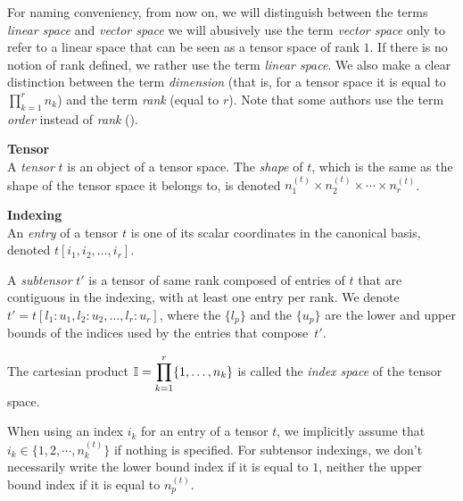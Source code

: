 \begin{remark}
For naming conveniency, from now on, we will distinguish between the terms \emph{linear space} and \emph{vector space} \ie we will abusively use the term \emph{vector space} only to refer to a linear space that can be seen as a tensor space of rank $1$. If there is no notion of rank defined, we rather use the term \emph{linear space}.
We also make a clear distinction between the term \emph{dimension} (that is, for a tensor space it is equal to $\displaystyle \prod_{k=1}^r n_k$) and the term \emph{rank} (equal to $r$). Note that some authors use the term \emph{order} instead of \emph{rank} (\eg \cite{hackbusch2012tensor}).
\end{remark}

\begin{definition}\textbf{Tensor}\\
A \emph{tensor} $t$ is an object of a tensor space. The \emph{shape} of $t$, which is the same as the shape of the tensor space it belongs to, is denoted $n_1^{(t)} \times n_2^{(t)} \times \cdots \times n_r^{(t)}$.
\end{definition}

\begin{definition}\textbf{Indexing}\\
An \emph{entry} of a tensor $t$ is one of its scalar coordinates in the canonical basis, denoted $t[i_1, i_2, \ldots, i_r]$.

A \emph{subtensor} $t'$ is a tensor of same rank composed of entries of $t$ that are contiguous in the indexing, with at least one entry per rank. We denote $t' = t[l_1{:}u_1, l_2{:}u_2, \ldots, l_r{:}u_r]$, where the $\{l_p\}$ and the $\{u_p\}$ are the lower and upper bounds of the indices used by the entries that compose~$t'$.

The cartesian product $\mathbb{I}=\displaystyle \prod_{k=1}^r \{1, \ldots, n_k \}$ is called the \emph{index space} of the tensor space.
\end{definition}

\begin{remark}
When using an index $i_k$ for an entry of a tensor $t$, we implicitly assume that $i_k \in \{1, 2, \cdots, n_k^{(t)}\}$ if nothing is specified.
For subtensor indexings, we don't necessarily write the lower bound index if it is equal to $1$, neither the upper bound index if it is equal to $n_p^{(t)}$.
\end{remark}

